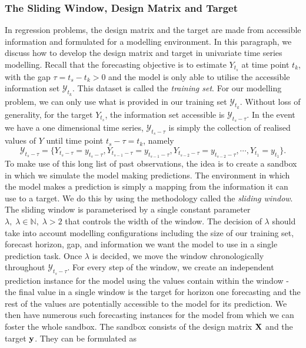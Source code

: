 \subsubsection{The Sliding Window, Design Matrix and Target}
In regression problems, the design matrix and the target are made from accessible information and formulated for a modelling environment. In this paragraph, we discuss how to develop the design matrix and target in univariate time series modelling. Recall that the forecasting objective is to estimate $Y_{t_s}$ at time point $t_k$, with the gap $\tau = t_s - t_k > 0$ and the model is only able to utilise the accessible information set $\mathcal{Y}_{t_k}$. This dataset is called the \textit{training set}. For our modelling problem, we can only use what is provided in our training set $\mathcal{Y}_{t_k}$. Without loss of generality, for the target $Y_{t_s}$, the information set accessible is $\mathcal{Y}_{t_s - \tau}$. In the event we have a one dimensional time series, $\mathcal{Y}_{t_s-\tau}$ is simply the collection of realised values of $Y$ until time point $t_s-\tau = t_k$, namely
\begin{equation*}
    \mathcal{Y}_{t_s-\tau} = \{ Y_{t_s-\tau} = y_{t_s-\tau}, Y_{t_{s-1}-\tau} = y_{t_{s-1}-\tau}, Y_{t_{s-2}-\tau} = y_{t_{s-2}-\tau}, \cdots, Y_{t_1} = y_{t_1} \}.
\end{equation*}
To make use of this long list of past observations, the idea is to create a sandbox in which we simulate the model making predictions. The environment in which the model makes a prediction is simply a mapping from the information it can use to a target. We do this by using the methodology called the \textit{sliding window}. The sliding window is parameterised by a single constant parameter $\lambda, \; \lambda \in \mathbb{N}, \; \lambda > 2$ that controls the width of the window. The decision of $\lambda$ should take into account modelling configurations including the size of our training set, forecast horizon, gap, and information we want the model to use in a single prediction task. Once $\lambda$ is decided, we move the window chronologically throughout $\mathcal{Y}_{t_s -\tau}$. For every step of the window, we create an independent prediction instance for the model using the values contain within the window - the final value in a single window is the target for horizon one forecasting and the rest of the values are potentially accessible to the model for its prediction. We then have numerous such forecasting instances for the model from which we can foster the whole sandbox. The sandbox consists of the design matrix $\mathbf{X}$ and the target $\mathbf{y}$. They can be formulated as
